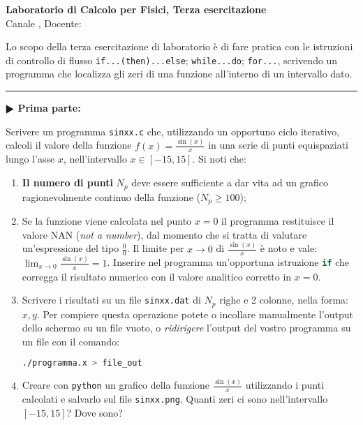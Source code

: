 \documentclass[11pt]{article}
\begin{document}
\pagestyle{empty}

\begin{center}
{\Large \bf  Laboratorio di Calcolo per Fisici, Terza esercitazione\\[2mm]}
{\large Canale \canale, Docente: \docente}
\end{center}
\vspace{4mm}

\begin{mdframed}[backgroundcolor=panna]
  Lo scopo della terza esercitazione di laboratorio \`e di fare pratica con
  le istruzioni di controllo di flusso \texttt{if...(then)...else}; \texttt{while...do};
\texttt{for...}, scrivendo un programma che localizza gli zeri di una funzione
all'interno di un intervallo dato.
  \end{mdframed}
%
%

\hrule
\vspace{2mm}
\textbf{$\RHD$ Prima parte:}

Scrivere un programma \texttt{sinxx.c} che, utilizzando un opportuno ciclo iterativo,
calcoli il valore della funzione $f(x)=\frac{\sin(x)}{x}$ in una serie di
punti equispaziati lungo l'asse $x$, nell'intervallo $x \in \left[-15,15 \right]$.
Si noti che:
\begin{enumerate}
\item  {\bf Il numero di punti} $N_{p}$ deve essere sufficiente a dar vita ad un grafico ragionevolmente continuo della funzione ($N_p \ge 100$);
\item Se la funzione viene calcolata nel punto $x=0$ il programma restituisce il valore NAN (\emph{not a number}), 
dal momento che si tratta di valutare un'espressione del tipo $\frac{0}{0}$. Il limite per $x \to 0$ di 
$\frac{\sin(x)}{x}$ \`e noto e vale: $\lim_{x \to 0} \frac{\sin(x)}{x} = 1$.
Inserire nel programma un'opportuna  istruzione \lstinline[language=c]!if! che corregga il risultato numerico con il valore analitico corretto in $x=0$.
\item Scrivere i risultati su un file \texttt{sinxx.dat} di $N_p$ righe e 2 colonne, nella forma: $x,y$. Per compiere questa operazione potete o incollare manualmente l'output dello schermo su un file vuoto, o {\em ridirigere\/} l'output
del vostro programma su un file con il comando:
\\
\begin{lstlisting}[numbers=none,language=bash]
./programma.x > file_out
\end{lstlisting}
\item Creare con \texttt{python} un grafico della funzione $\frac{\sin(x)}{x}$
utilizzando i punti calcolati e salvarlo sul file \texttt{sinxx.png}. 
 Quanti zeri ci sono nell'intervallo $\left[ -15,15 \right]$? Dove sono?
\end{enumerate}
\end{document}
